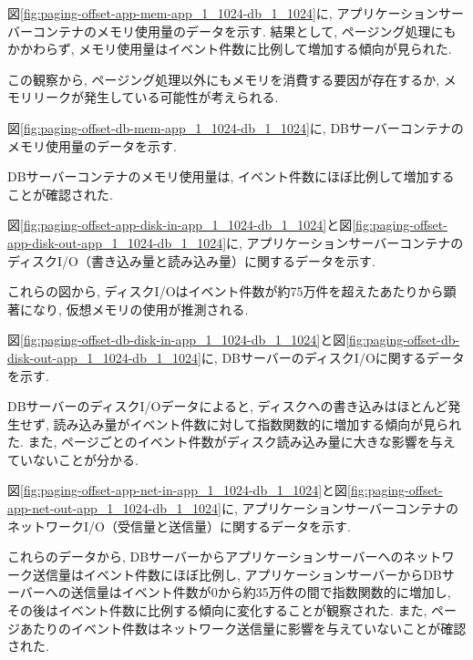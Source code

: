 \documentclass[../../../../main]{subfiles}
\begin{document}
    図\ref{fig:paging-offset-app-mem-app_1_1024-db_1_1024}に, アプリケーションサーバーコンテナのメモリ使用量のデータを示す. 結果として, ページング処理にもかかわらず, メモリ使用量はイベント件数に比例して増加する傾向が見られた.

    

    この観察から, ページング処理以外にもメモリを消費する要因が存在するか, メモリリークが発生している可能性が考えられる.

    図\ref{fig:paging-offset-db-mem-app_1_1024-db_1_1024}に, DBサーバーコンテナのメモリ使用量のデータを示す.

    

    DBサーバーコンテナのメモリ使用量は, イベント件数にほぼ比例して増加することが確認された.

    \label{subsubsubsec:result-paging-offset-only-limit-disk-io}

    図\ref{fig:paging-offset-app-disk-in-app_1_1024-db_1_1024}と図\ref{fig:paging-offset-app-disk-out-app_1_1024-db_1_1024}に, アプリケーションサーバーコンテナのディスクI/O（書き込み量と読み込み量）に関するデータを示す.

    
    

    これらの図から, ディスクI/Oはイベント件数が約75万件を超えたあたりから顕著になり, 仮想メモリの使用が推測される.

    図\ref{fig:paging-offset-db-disk-in-app_1_1024-db_1_1024}と図\ref{fig:paging-offset-db-disk-out-app_1_1024-db_1_1024}に, DBサーバーのディスクI/Oに関するデータを示す.

    
    

    DBサーバーのディスクI/Oデータによると, ディスクへの書き込みはほとんど発生せず, 読み込み量がイベント件数に対して指数関数的に増加する傾向が見られた. また, ページごとのイベント件数がディスク読み込み量に大きな影響を与えていないことが分かる.

    \label{subsubsubsec:result-paging-offset-only-limit-net-io}

    図\ref{fig:paging-offset-app-net-in-app_1_1024-db_1_1024}と図\ref{fig:paging-offset-app-net-out-app_1_1024-db_1_1024}に, アプリケーションサーバーコンテナのネットワークI/O（受信量と送信量）に関するデータを示す.

    
    

    これらのデータから, DBサーバーからアプリケーションサーバーへのネットワーク送信量はイベント件数にほぼ比例し, アプリケーションサーバーからDBサーバーへの送信量はイベント件数が0から約35万件の間で指数関数的に増加し, その後はイベント件数に比例する傾向に変化することが観察された. また, ページあたりのイベント件数はネットワーク送信量に影響を与えていないことが確認された.
\end{document}
